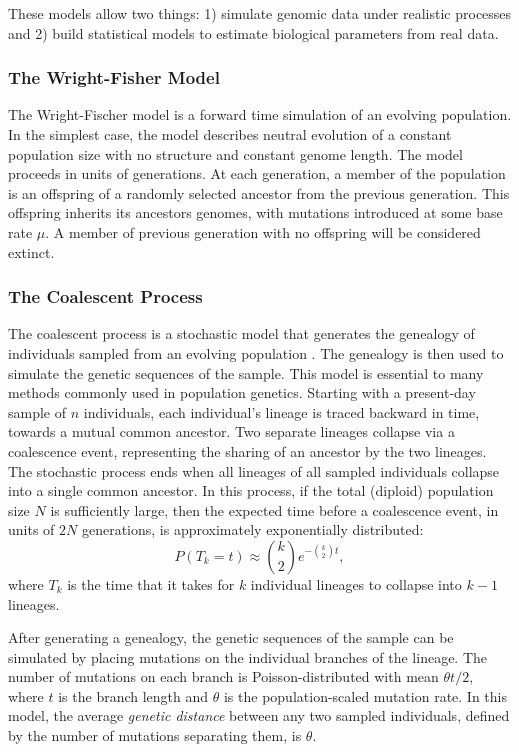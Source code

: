 These models allow two things: 1) simulate genomic data under realistic processes and 2) build statistical models to estimate biological parameters from real data.

\subsubsection{The Wright-Fisher Model}

The Wright-Fischer model is a forward time simulation of an evolving population.
In the simplest case, the model describes neutral evolution of a constant population size with no structure and constant genome length.
The model proceeds in units of generations.
At each generation, a member of the population is an offspring of a randomly selected ancestor from the previous generation.
This offspring inherits its ancestors genomes, with mutations introduced at some base rate $\mu$.
A member of previous generation with no offspring will be considered extinct.

\subsubsection{The Coalescent Process}

The coalescent process is a stochastic model that generates the genealogy of individuals sampled from an evolving population \cite{Wakeley:2009}.
The genealogy is then used to simulate the genetic sequences of the sample.
This model is essential to many methods commonly used in population genetics.
Starting with a present-day sample of $n$ individuals, each individual's lineage is traced backward in time, towards a mutual common ancestor.
Two separate lineages collapse via a coalescence event, representing the sharing of an ancestor by the two lineages.
The stochastic process ends when all lineages of all sampled individuals collapse into a single common ancestor.
In this process, if the total (diploid) population size $N$ is sufficiently large, then the expected time before a coalescence event, in units of $2N$ generations, is approximately exponentially distributed:
\begin{equation}
P(T_{k}=t) \approx \binom{k}{2} e^{-\binom{k}{2} t},
\end{equation}
where $T_k$ is the time that it takes for $k$ individual lineages to collapse into $k-1$ lineages.

After generating a genealogy, the genetic sequences of the sample can be simulated by placing mutations on the individual branches of the lineage.
The number of mutations on each branch is Poisson-distributed with mean $\theta t / 2$, where $t$ is the branch length and $\theta$ is the population-scaled mutation rate.
In this model, the average \emph{genetic distance} between any two sampled individuals, defined by the number of mutations separating them, is $\theta$.

